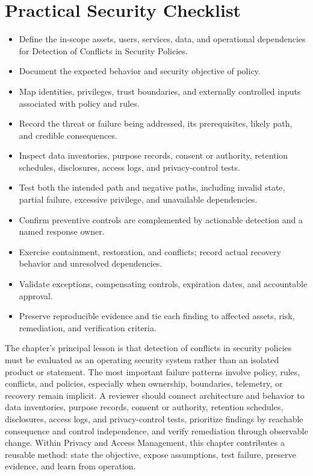 \documentclass[11pt]{article}
\begin{document}
\section*{Practical Security Checklist}
\begin{itemize}[label=$\square$]
\item Define the in-scope assets, users, services, data, and operational dependencies for Detection of Conflicts in Security Policies.
\item Document the expected behavior and security objective of policy.
\item Map identities, privileges, trust boundaries, and externally controlled inputs associated with policy and rules.
\item Record the threat or failure being addressed, its prerequisites, likely path, and credible consequences.
\item Inspect data inventories, purpose records, consent or authority, retention schedules, disclosures, access logs, and privacy-control tests.
\item Test both the intended path and negative paths, including invalid state, partial failure, excessive privilege, and unavailable dependencies.
\item Confirm preventive controls are complemented by actionable detection and a named response owner.
\item Exercise containment, restoration, and conflicts; record actual recovery behavior and unresolved dependencies.
\item Validate exceptions, compensating controls, expiration dates, and accountable approval.
\item Preserve reproducible evidence and tie each finding to affected assets, risk, remediation, and verification criteria.
\end{itemize}
\begin{synthesisbox}
The chapter's principal lesson is that detection of conflicts in security policies must be evaluated as an operating security system rather than an isolated product or statement. The most important failure patterns involve policy, rules, conflicts, and policies, especially when ownership, boundaries, telemetry, or recovery remain implicit. A reviewer should connect architecture and behavior to data inventories, purpose records, consent or authority, retention schedules, disclosures, access logs, and privacy-control tests, prioritize findings by reachable consequence and control independence, and verify remediation through observable change. Within Privacy and Access Management, this chapter contributes a reusable method: state the objective, expose assumptions, test failure, preserve evidence, and learn from operation.
\end{synthesisbox}
\end{document}
